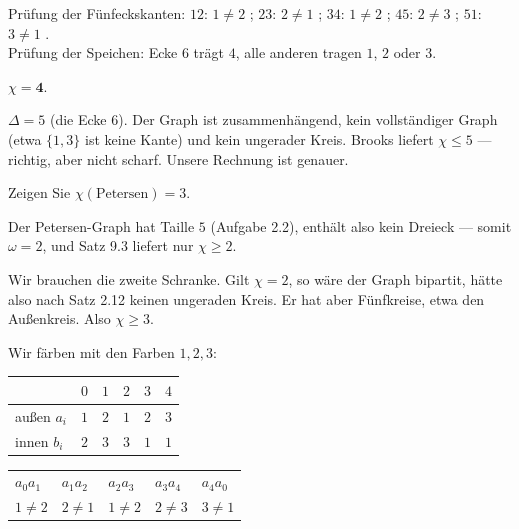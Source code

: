 \begin{aufgabe}
Prüfung der Fünfeckskanten: $12$: $1\neq2$ \checkmark; $23$: $2\neq1$ \checkmark; $34$: $1\neq2$ \checkmark; $45$: $2\neq3$ \checkmark; $51$: $3\neq1$ \checkmark.\\
Prüfung der Speichen: Ecke $6$ trägt $4$, alle anderen tragen $1$, $2$ oder $3$. \checkmark

$\chi = \mathbf{4}$.

$\Delta = 5$ (die Ecke $6$). Der Graph ist zusammenhängend, kein vollständiger Graph (etwa $\{1,3\}$ ist keine Kante) und kein ungerader Kreis. Brooks liefert $\chi \le 5$ --- richtig, aber nicht scharf. Unsere Rechnung ist genauer.
\end{aufgabe}

\begin{aufgabe}
Zeigen Sie $\chi(\text{Petersen}) = 3$.

\loesung
{}
Der Petersen-Graph hat Taille $5$ (Aufgabe 2.2), enthält also kein Dreieck --- somit $\omega = 2$, und Satz 9.3 liefert nur $\chi \ge 2$.

Wir brauchen die zweite Schranke. Gilt $\chi = 2$, so wäre der Graph bipartit, hätte also nach Satz 2.12 keinen ungeraden Kreis. Er hat aber Fünfkreise, etwa den Außenkreis. Also $\chi \ge 3$.

Wir färben mit den Farben $1,2,3$:
\begin{center}
{\small
\renewcommand{\arraystretch}{1.4}
\begin{tabular}{@{}P{1.6cm}P{0.9cm}P{0.9cm}P{0.9cm}P{0.9cm}P{0.9cm}@{}}
\toprule
& $0$ & $1$ & $2$ & $3$ & $4$\\
\midrule
außen $a_i$ & $1$ & $2$ & $1$ & $2$ & $3$\\
innen $b_i$ & $2$ & $3$ & $3$ & $1$ & $1$\\
\bottomrule
\end{tabular}}
\end{center}

\begin{center}
{\small
\renewcommand{\arraystretch}{1.32}
\begin{tabular}{@{}P{1.6cm}P{1.6cm}P{1.6cm}P{1.6cm}P{1.6cm}@{}}
\toprule
$a_0a_1$ & $a_1a_2$ & $a_2a_3$ & $a_3a_4$ & $a_4a_0$\\
$1\neq2$ & $2\neq1$ & $1\neq2$ & $2\neq3$ & $3\neq1$\\
\bottomrule
\end{tabular}}
\end{center}


\end{aufgabe}
